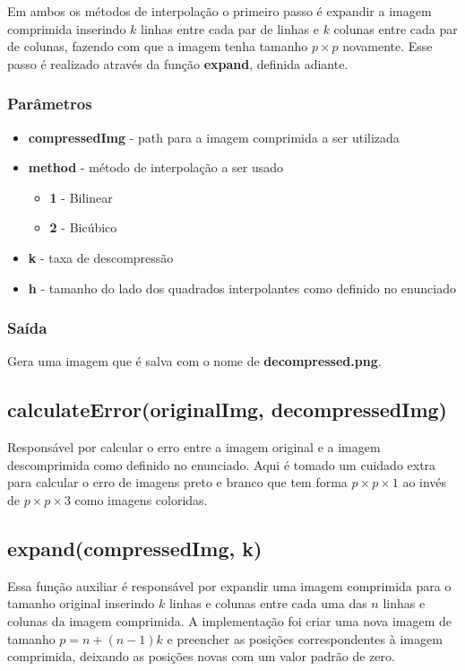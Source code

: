 \documentclass[leqno]{article}
\begin{document}
Em ambos os métodos de interpolação o primeiro passo é expandir a
imagem comprimida inserindo $k$ linhas entre cada par de linhas e $k$ colunas
entre cada par de colunas, fazendo com que a imagem tenha tamanho $p \times p$
novamente. Esse passo é realizado através da função \textbf{expand}, definida
adiante.


\subsubsection{Parâmetros}
\begin{itemize}
    \item \textbf{compressedImg} - path para a imagem comprimida a ser utilizada
    \item \textbf{method} - método de interpolação a ser usado
    \begin{itemize}
        \item \textbf{1} - Bilinear
        \item \textbf{2} - Bicúbico
    \end{itemize}
    \item \textbf{k} - taxa de descompressão
    \item \textbf{h} - tamanho do lado dos quadrados interpolantes como definido
                        no enunciado
\end{itemize}

\subsubsection{Saída}
Gera uma imagem que é salva com o nome de \textbf{decompressed.png}.


\subsection{calculateError(originalImg, decompressedImg)}
Responsável por calcular o erro entre a imagem original e a imagem descomprimida
como definido no enunciado. Aqui é tomado um cuidado extra para calcular o erro
de imagens preto e branco que tem forma $p \times p \times 1$ ao invés de 
$p \times p \times 3$ como imagens coloridas.




\subsection{expand(compressedImg, k)}
Essa função auxiliar é responsável por expandir uma imagem comprimida para o
tamanho original inserindo $k$ linhas e colunas entre cada uma das $n$ linhas
e colunas da imagem comprimida.
A implementação foi criar uma nova imagem de tamanho $p = n + (n-1)k$ e preencher
as posições correspondentes à imagem comprimida, deixando as posições novas com
um valor padrão de zero.
\end{document}
